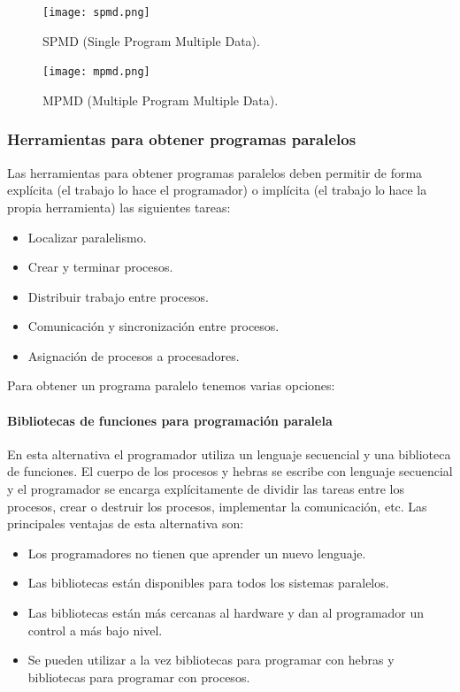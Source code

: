 \documentclass[12pt,spanish]{article}
\begin{document}
\begin{figure}[H]
\centering
\texttt{[image: spmd.png]}
\caption{SPMD (Single Program Multiple Data).}
\end{figure}

\begin{figure}[H]
\centering
\texttt{[image: mpmd.png]}
\caption{MPMD (Multiple Program Multiple Data).}
\end{figure}

\subsubsection{Herramientas para obtener programas paralelos}

Las herramientas para obtener programas paralelos deben permitir de forma explícita (el trabajo lo hace el programador) o implícita (el trabajo lo hace la propia herramienta) las siguientes tareas:

\begin{itemize}
	\item Localizar paralelismo.
	\item Crear y terminar procesos.
	\item Distribuir trabajo entre procesos.
	\item Comunicación y sincronización entre procesos.
	\item Asignación de procesos a procesadores.
\end{itemize}

Para obtener un programa paralelo tenemos varias opciones:

\paragraph{Bibliotecas de funciones para programación paralela}

En esta alternativa el programador utiliza un lenguaje secuencial y una biblioteca de funciones. El cuerpo de los procesos y hebras se escribe con lenguaje secuencial y el programador se encarga explícitamente de dividir las tareas entre los procesos, crear o destruir los procesos, implementar la comunicación, etc. Las principales ventajas de esta alternativa son:
\begin{itemize}
	\item Los programadores no tienen que aprender un nuevo lenguaje.
	\item Las bibliotecas están disponibles para todos los sistemas paralelos.
	\item Las bibliotecas están más cercanas al hardware y dan al programador un control a más bajo nivel.
	\item Se pueden utilizar a la vez bibliotecas para programar con hebras y bibliotecas para programar con procesos.
\end{itemize}
\end{document}
